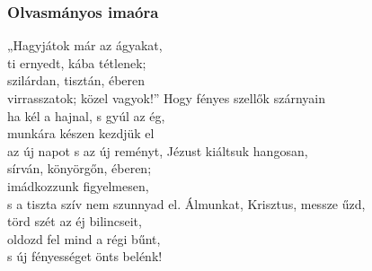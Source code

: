 \documentclass[twoside]{article}
\begin{document}
\subsubsection*{Olvasmányos imaóra}



\begin{hymnstanzas}
    „Hagyjátok már az ágyakat,\\
    ti ernyedt, kába tétlenek;\\
    szilárdan, tisztán, éberen\\
    virrasszatok; közel vagyok!”
\stanzabreak
    Hogy fényes szellők szárnyain\\
    ha kél a hajnal, s gyúl az ég,\\
    munkára készen kezdjük el\\
    az új napot s az új reményt,
\stanzabreak
    Jézust kiáltsuk hangosan,\\
    sírván, könyörgőn, éberen;\\
    imádkozzunk figyelmesen,\\
    s a tiszta szív nem szunnyad el.
\stanzabreak
    Álmunkat, Krisztus, messze űzd,\\
    törd szét az éj bilincseit,\\
    oldozd fel mind a régi bűnt,\\
    s új fényességet önts belénk!
\end{hymnstanzas}



\end{document}
